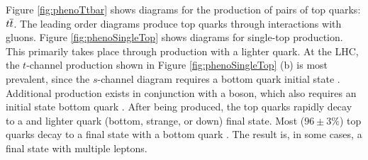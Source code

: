 
Figure \ref{fig:phenoTtbar} shows diagrams for the production of pairs of top quarks: $t\overline{t}$.
The leading order diagrams produce top quarks through interactions with gluons.
Figure \ref{fig:phenoSingleTop} shows diagrams for single-top production.
This primarily takes place through production with a lighter quark.
At the LHC, the $t$-channel production shown in Figure \ref{fig:phenoSingleTop} (b) is most prevalent, since the $s$-channel diagram requires a bottom quark initial state \cite{Kidonakis:2011wy}.
Additional production exists in conjunction with a \W boson, which also requires an initial state bottom quark \cite{Kidonakis:2010ux}.
After being produced, the top quarks rapidly decay to a \W and lighter quark (bottom, strange, or down) final state.
Most ($96\pm3\%$) top quarks decay to a final state with a bottom quark \cite{pdg2018}.
The result is, in some cases, a final state with multiple leptons.

